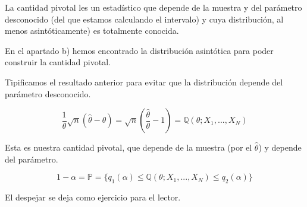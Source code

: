 \begin{problem}[5]
\spart
La cantidad pivotal les un estadístico que depende de la muestra y del parámetro desconocido (del que estamos calculando el intervalo) y cuya distribución, al menos asintóticamente) es totalmente conocida.

En el apartado b) hemos encontrado la distribución asintótica para poder construir la cantidad pivotal.

Tipificamos el resultado anterior para evitar que la distribución depende del parámetro desconocido.

\[
\frac{1}{\theta} \sqrt{n}(\hat{\theta} - \theta)  = 
\sqrt{n} \left(\frac{\hat{\theta}}{\theta} - 1 \right) = \mathbb{Q}(\theta;X_1,...,X_N)
\]

Esta es nuestra cantidad pivotal, que depende de la muestra (por el $\hat{\theta}$) y depende del parámetro.

\[1-\alpha  = \mathbb{P} = \{q_1(\alpha) \leq \mathbb{Q}(\theta;X_1,...,X_N) \leq q_2 (\alpha)\}\]


El despejar se deja como ejercicio para el lector.

\end{problem}

